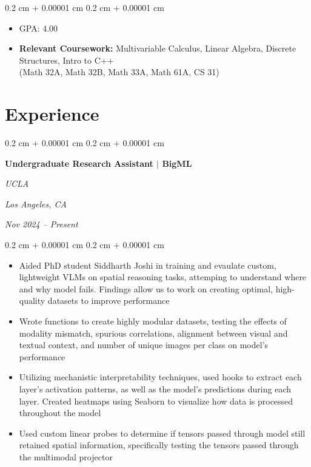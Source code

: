 \documentclass[10pt, letterpaper]{article}
\newenvironment{highlights}{
    \begin{itemize}[
        topsep=0.10 cm,
        parsep=0.10 cm,
        partopsep=0pt,
        itemsep=0pt,
        leftmargin=0.4 cm + 10pt
    ]
}{
    \end{itemize}
} %
\newenvironment{onecolentry}{
    \begin{adjustwidth}{
        0.2 cm + 0.00001 cm
    }{
        0.2 cm + 0.00001 cm
    }
}{
    \end{adjustwidth}
} %
\newenvironment{twocolentry}[2][]{
    \onecolentry
    \def\secondColumn{#2}
    \setcolumnwidth{\fill, 4.5 cm}
    \begin{paracol}{2}
}{
    \switchcolumn \raggedleft \secondColumn
    \end{paracol}
    \endonecolentry
} %
\let\hrefWithoutArrow\href
\renewcommand{\href}[2]{\hrefWithoutArrow{#1}{\ifthenelse{\equal{#2}{}}{ }{#2 }\raisebox{.15ex}{\footnotesize \faExternalLink*}}}
\begin{document}
        \vspace{0.10 cm}
        \begin{onecolentry}
            \begin{highlights}
                \item GPA: 4.00 %
                \item \textbf{Relevant Coursework:}  Multivariable Calculus, Linear Algebra, Discrete Structures, Intro to C++ \\ (Math 32A, Math 32B, Math 33A, Math 61A, CS 31)
            \end{highlights}
        \end{onecolentry}

    \section{Experience}
        \begin{twocolentry}{
        \textit{Los Angeles, CA}    
            
        \textit{Nov 2024 – Present}}
            \textbf{Undergraduate Research Assistant $|$ BigML}
            
            \textit{UCLA}
        \end{twocolentry}

        \vspace{0.10 cm}
        \begin{onecolentry}
            \begin{highlights}
                \item{Aided PhD student Siddharth Joshi in training and evaulate custom, lightweight VLMs on spatial reasoning tasks, attemping to understand where and why model fails. Findings allow us to work on creating optimal, high-quality datasets to improve performance}
                \item{Wrote functions to create highly modular datasets, testing the effects of modality mismatch, spurious correlations, alignment between visual and textual context, and number of unique images per class on model's performance}
                \item{Utilizing mechanistic interpretability techniques, used hooks to extract each layer's activation patterns, as well as the model's predictions during each layer. Created heatmaps using Seaborn to visualize how data is processed throughout the model}
                \item{Used custom linear probes to determine if tensors passed through model still retained spatial information, specifically testing the tensors passed through the multimodal projector}
            \end{highlights}
        \end{onecolentry}
    
\end{document}
